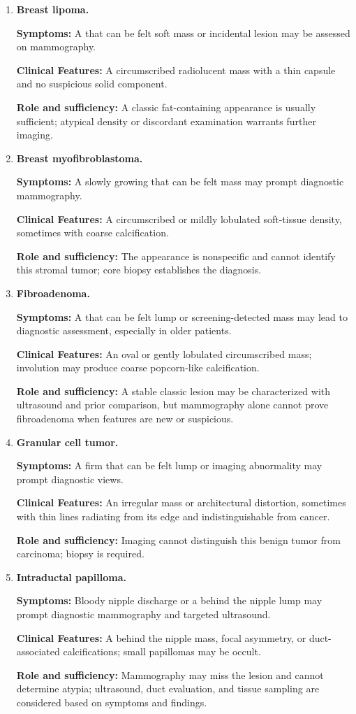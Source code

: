 \begin{enumerate}[leftmargin=*,itemsep=0.45em,topsep=0.4em]
\item \textbf{Breast lipoma.}\par\noindent\textbf{Symptoms:} A that can be felt soft mass or incidental lesion may be assessed on mammography.\par\noindent\textbf{Clinical Features:} A circumscribed radiolucent mass with a thin capsule and no suspicious solid component.\par\noindent\textbf{Role and sufficiency:} A classic fat-containing appearance is usually sufficient; atypical density or discordant examination warrants further imaging.
\item \textbf{Breast myofibroblastoma.}\par\noindent\textbf{Symptoms:} A slowly growing that can be felt mass may prompt diagnostic mammography.\par\noindent\textbf{Clinical Features:} A circumscribed or mildly lobulated soft-tissue density, sometimes with coarse calcification.\par\noindent\textbf{Role and sufficiency:} The appearance is nonspecific and cannot identify this stromal tumor; core biopsy establishes the diagnosis.
\item \textbf{Fibroadenoma.}\par\noindent\textbf{Symptoms:} A that can be felt lump or screening-detected mass may lead to diagnostic assessment, especially in older patients.\par\noindent\textbf{Clinical Features:} An oval or gently lobulated circumscribed mass; involution may produce coarse popcorn-like calcification.\par\noindent\textbf{Role and sufficiency:} A stable classic lesion may be characterized with ultrasound and prior comparison, but mammography alone cannot prove fibroadenoma when features are new or suspicious.
\item \textbf{Granular cell tumor.}\par\noindent\textbf{Symptoms:} A firm that can be felt lump or imaging abnormality may prompt diagnostic views.\par\noindent\textbf{Clinical Features:} An irregular mass or architectural distortion, sometimes with thin lines radiating from its edge and indistinguishable from cancer.\par\noindent\textbf{Role and sufficiency:} Imaging cannot distinguish this benign tumor from carcinoma; biopsy is required.
\item \textbf{Intraductal papilloma.}\par\noindent\textbf{Symptoms:} Bloody nipple discharge or a behind the nipple lump may prompt diagnostic mammography and targeted ultrasound.\par\noindent\textbf{Clinical Features:} A behind the nipple mass, focal asymmetry, or duct-associated calcifications; small papillomas may be occult.\par\noindent\textbf{Role and sufficiency:} Mammography may miss the lesion and cannot determine atypia; ultrasound, duct evaluation, and tissue sampling are considered based on symptoms and findings.

\end{enumerate}
